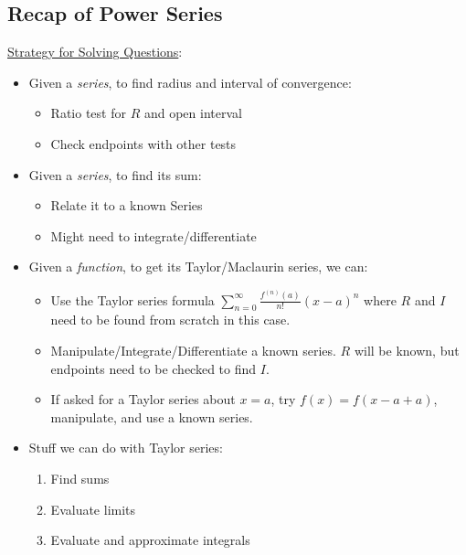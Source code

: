 \subsection*{Recap of Power Series}
\underline{Strategy for Solving Questions}:
\begin{itemize}
    \item Given a \emph{series}, to find radius and interval of
          convergence:
          \begin{itemize}
              \item Ratio test for $ R $ and open interval
              \item Check endpoints with other tests
          \end{itemize}
    \item Given a \emph{series}, to find its sum:
          \begin{itemize}
              \item Relate it to a known Series
              \item Might need to integrate/differentiate
          \end{itemize}
    \item Given a \emph{function},
          to get its Taylor/Maclaurin series, we can:
          \begin{itemize}
              \item Use the Taylor series formula $ \displaystyle \sum\limits_{n=0}^{\infty}
                        \frac{f^{(n)}(a)}{n!} (x-a)^n $ where $ R $ and $ I $ need to be found from scratch
                    in this case.
              \item Manipulate/Integrate/Differentiate a known series. $ R $ will be known,
                    but endpoints need to be checked to find $ I $.
              \item If asked for a Taylor series about $ x=a $, try $ f(x)=f(x-a+a) $,
                    manipulate, and use a known series.
          \end{itemize}
    \item Stuff we can do with Taylor series:
          \begin{enumerate}[label=(\Roman*)]
              \item Find sums
              \item Evaluate limits
              \item Evaluate and approximate integrals
          \end{enumerate}
\end{itemize}
